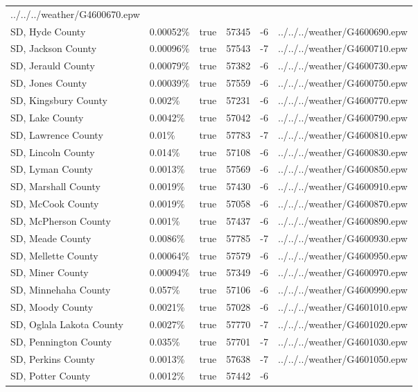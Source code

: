 \begin{longtable}[]{@{}llllll@{}}
../../../weather/G4600670.epw \\
SD, Hyde County & 0.00052\% & true & 57345 & -6 &
../../../weather/G4600690.epw \\
SD, Jackson County & 0.00096\% & true & 57543 & -7 &
../../../weather/G4600710.epw \\
SD, Jerauld County & 0.00079\% & true & 57382 & -6 &
../../../weather/G4600730.epw \\
SD, Jones County & 0.00039\% & true & 57559 & -6 &
../../../weather/G4600750.epw \\
SD, Kingsbury County & 0.002\% & true & 57231 & -6 &
../../../weather/G4600770.epw \\
SD, Lake County & 0.0042\% & true & 57042 & -6 &
../../../weather/G4600790.epw \\
SD, Lawrence County & 0.01\% & true & 57783 & -7 &
../../../weather/G4600810.epw \\
SD, Lincoln County & 0.014\% & true & 57108 & -6 &
../../../weather/G4600830.epw \\
SD, Lyman County & 0.0013\% & true & 57569 & -6 &
../../../weather/G4600850.epw \\
SD, Marshall County & 0.0019\% & true & 57430 & -6 &
../../../weather/G4600910.epw \\
SD, McCook County & 0.0019\% & true & 57058 & -6 &
../../../weather/G4600870.epw \\
SD, McPherson County & 0.001\% & true & 57437 & -6 &
../../../weather/G4600890.epw \\
SD, Meade County & 0.0086\% & true & 57785 & -7 &
../../../weather/G4600930.epw \\
SD, Mellette County & 0.00064\% & true & 57579 & -6 &
../../../weather/G4600950.epw \\
SD, Miner County & 0.00094\% & true & 57349 & -6 &
../../../weather/G4600970.epw \\
SD, Minnehaha County & 0.057\% & true & 57106 & -6 &
../../../weather/G4600990.epw \\
SD, Moody County & 0.0021\% & true & 57028 & -6 &
../../../weather/G4601010.epw \\
SD, Oglala Lakota County & 0.0027\% & true & 57770 & -7 &
../../../weather/G4601020.epw \\
SD, Pennington County & 0.035\% & true & 57701 & -7 &
../../../weather/G4601030.epw \\
SD, Perkins County & 0.0013\% & true & 57638 & -7 &
../../../weather/G4601050.epw \\
SD, Potter County & 0.0012\% & true & 57442 & -6 &

\end{longtable}
